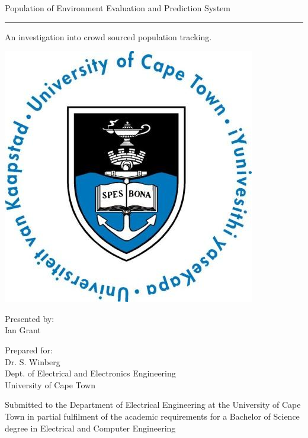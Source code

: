  



 
\thispagestyle{empty}
{\Huge \begin{center}

Population of Environment Evaluation and Prediction System
\hrule 
{\Large An investigation into crowd sourced population tracking.}
\end{center}}

\vskip 5mm
\begin{center}
\includegraphics[scale = 0.3]{uctLogo.png}
\end{center}

\vskip 5mm
\begin{center}
Presented by:\\
Ian Grant		
\end{center}

\vskip 10mm
\begin{center}
Prepared for:\\
Dr. S. Winberg\\ 		
Dept. of Electrical and Electronics Engineering\\University of Cape Town
\end{center}


\vskip 10mm
\begin{center}
Submitted to the Department of Electrical Engineering at the University of Cape Town in partial
fulfilment of the academic requirements for a Bachelor of Science degree in Electrical and Computer Engineering

\end{center}


